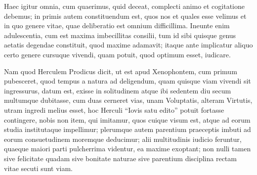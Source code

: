 
Haec igitur omnia, cum quaerimus, quid deceat, complecti animo et cogitatione debemus; in primis autem constituendum est, quos nos et quales esse velimus et in quo genere vitae, quae deliberatio est omnium difficillima. Ineunte enim adulescentia, cum est maxima imbecillitas consilii, tum id sibi quisque genus aetatis degendae constituit, quod maxime adamavit; itaque ante implicatur aliquo certo genere cursuque vivendi, quam potuit, quod optimum esset, iudicare.

Nam quod Herculem Prodicus dicit, ut est apud Xenophontem, cum primum pubesceret, quod tempus a natura ad deligendum, quam quisque viam vivendi sit ingressurus, datum est, exisse in solitudinem atque ibi sedentem diu secum multumque dubitasse, cum duas cerneret vias, unam Voluptatis, alteram Virtutis, utram ingredi melius esset, hoc Herculi ``Iovis satu edito'' potuit fortasse contingere, nobis non item, qui imitamur, quos cuique visum est, atque ad eorum studia institutaque impellimur; plerumque autem parentium praeceptis imbuti ad eorum consuetudinem moremque deducimur; alii multitudinis iudicio feruntur, quaeque maiori parti pulcherrima videntur, ea maxime exoptant; non nulli tamen sive felicitate quadam sive bonitate naturae sive parentium disciplina rectam vitae secuti sunt viam.
